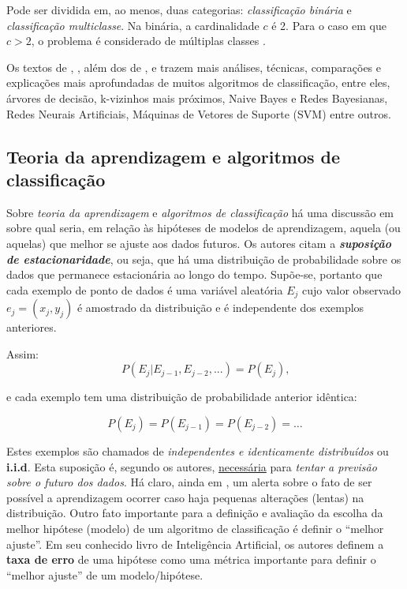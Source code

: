 Pode ser dividida em, ao menos, duas categorias: \textit{classificação binária} e \textit{classificação multiclasse}. Na binária, a cardinalidade $c$ é 2. Para o caso em que $c > 2$, o problema é considerado de múltiplas classes \cite{Boscarioli2017, classification2013}.

Os textos de , , além dos de ,  e   trazem mais análises, técnicas, comparações e explicações mais aprofundadas de muitos algoritmos de classificação, entre eles, árvores de decisão, k-vizinhos mais próximos, Naive Bayes e Redes Bayesianas, Redes Neurais Artificiais, Máquinas de Vetores de Suporte (SVM) entre outros.   

\subsection{Teoria da aprendizagem e algoritmos de classificação }\label{sec:teoria_aprendizagem}
Sobre \textit{teoria da aprendizagem} e \textit{algoritmos de classificação} há uma discussão em  sobre qual seria, em relação às hipóteses de modelos de aprendizagem, aquela (ou aquelas) que melhor se ajuste aos dados futuros. Os autores citam a \textbf{\textit{suposição de estacionaridade}}, ou seja, que há uma distribuição de probabilidade sobre os dados que permanece estacionária ao longo do tempo. Supõe-se, portanto que cada exemplo de ponto de dados %
é uma variável aleatória $E_j$ cujo valor observado $e_j = (x_j, y_j)$ é amostrado da distribuição e é independente dos exemplos anteriores. 

Assim:
\begin{equation}
	P (E_j|E_{j-1},E_{j-2}, ... ) = P(E_j) \textrm{,} 
\end{equation}

e cada exemplo tem uma distribuição de probabilidade anterior idêntica:

\begin{equation}
P(E_j) = P(E_{j-1}) = P(E_{j-2}) = \dots 
\end{equation}

Estes exemplos são chamados de \textit{independentes e identicamente distribuídos} ou \textbf{i.i.d}. Esta suposição é, segundo os autores, \underline{necessária} para \textit{tentar a previsão sobre o futuro dos dados}. Há claro, ainda em , um alerta sobre o fato de ser possível a aprendizagem ocorrer caso haja pequenas alterações (lentas) na distribuição. Outro fato importante para a definição e avaliação da escolha da melhor hipótese (modelo) de um algoritmo de classificação é definir o ``melhor ajuste''. Em seu conhecido livro de Inteligência Artificial, os autores  definem a \textbf{taxa de erro} de uma hipótese como uma métrica importante para definir o ``melhor ajuste'' de um modelo/hipótese.


